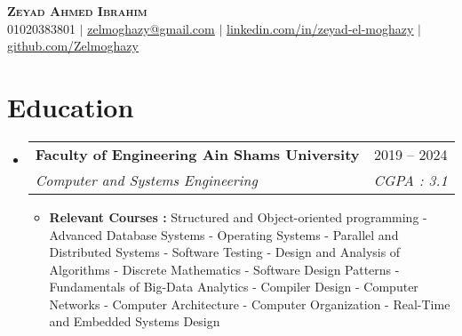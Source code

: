 \documentclass[letterpaper,11pt]{article}
\makeatletter
\newcommand*{\img}[1]{%
    \raisebox{-.3\baselineskip}{%
        \texttt{[image: \#1]}%
    }%
}
\newcommand{\resumeItem}[1]{
  \item\small{
    {#1 \vspace{-2pt}}
  }
}
\newcommand{\resumeSubheading}[4]{
  \vspace{-2pt}\item
    \begin{tabular*}{0.97\textwidth}[t]{l@{\extracolsep{\fill}}r}
      \textbf{#1} & #2 \\
      \textit{\small#3} & \textit{\small #4} \\
    \end{tabular*}\vspace{-7pt}
}
\newcommand{\resumeSubHeadingListStart}{\begin{itemize}[leftmargin=0.15in, label={}]}
\newcommand{\resumeSubHeadingListEnd}{\end{itemize}}
\newcommand{\resumeItemListStart}{\begin{itemize}}
\newcommand{\resumeItemListEnd}{\end{itemize}\vspace{-5pt}}
\makeatother
\begin{document}

\begin{center}
    \textbf{\Huge \scshape Zeyad Ahmed Ibrahim} \\ \vspace{1pt}
    \small \img{phone.png} 01020383801 $|$ \href{mailto:zelmoghazy@gmail.com}{\img{email.png} \underline{zelmoghazy@gmail.com}} $|$ 
    \href{https://www.linkedin.com/in/zeyad-el-moghazy/}{\img{linkedin.png} \underline{linkedin.com/in/zeyad-el-moghazy}} $|$
    \href{https://github.com/Zelmoghazy}{\img {github} \underline{github.com/Zelmoghazy}}
\end{center}


\section{Education}
  \resumeSubHeadingListStart
    \resumeSubheading
      {Faculty of Engineering Ain Shams University}{2019 -- 2024}
      {Computer and Systems Engineering}{CGPA : 3.1}
      \resumeItemListStart
        \resumeItem{\textbf{Relevant Courses : }Structured and Object-oriented programming - Advanced Database Systems - Operating Systems - Parallel and Distributed Systems - Software Testing - Design and Analysis of Algorithms - Discrete Mathematics - Software Design Patterns -  Fundamentals of Big-Data Analytics - Compiler Design - Computer Networks - Computer Architecture - Computer Organization - Real-Time and Embedded Systems Design}
        \resumeItemListEnd

  \resumeSubHeadingListEnd
  
\end{document}
